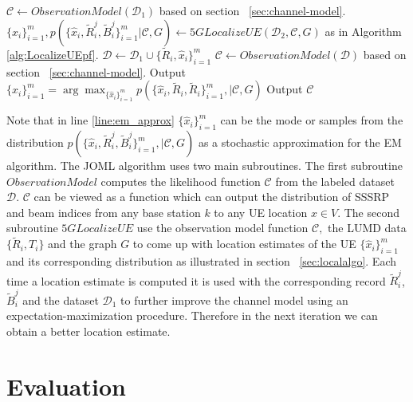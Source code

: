 \documentclass[conference, 10pt]{IEEEtran}
\begin{document}
\begin{algorithm}
\caption{$JOML(\mathcal{D}_1, \mathcal{D}_2, G, N_{em})$}
\label{alg:joint_ch_model_loc}
\begin{algorithmic}[1]
\State $\mathcal{C} \gets Observation Model(\mathcal{D}_1)$ based on section ~\ref{sec:channel-model}.
	\State $\{\hat{x}_i\}_{i=1}^m, p(\{\hat{x}_i,\tilde{R}^j_i,\tilde{B}^j_i\}_{i=1}^m|\mathcal{C},G) \gets 5GLocalizeUE(\mathcal{D}_2,\mathcal{C},G)$ as in Algorithm \ref{alg:LocalizeUEpf}. \label{step:localize}
	\State $\mathcal{D} \gets \mathcal{D}_1 \cup \{\tilde{R}_i,\hat{x}_i\}_{i=1}^m$ \label{line:em_approx}
	\State $\mathcal{C} \gets Observation Model(\mathcal{D})$ based on section ~\ref{sec:channel-model}.
\EndFor
\State Output $\{\hat{x}_i\}_{i=1}^m = \arg \max_{\{\hat{x}_i\}_{i=1}^m} p(\{\hat{x}_i,\tilde{R}_i, \tilde{R}_i\}_{i=1}^m,|\mathcal{C},G)$
\State Output $\mathcal{C}$
\end{algorithmic}
\end{algorithm}  

Note that in line \ref{line:em_approx} $\{\hat{x}_i\}_{i=1}^m$ can be the mode
or samples from the distribution
$p(\{\hat{x}_i,\tilde{R}^j_i, \tilde{B}^j_i\}_{i=1}^m,|\mathcal{C},G)$ as a stochastic
approximation for the EM algorithm. The JOML algorithm uses two main
subroutines. The first subroutine $ObservationModel$ computes the likelihood function
$\mathcal{C}$ from the labeled dataset $\mathcal{D}.$ $\mathcal{C}$ can be
viewed as a function which can output the distribution of SSSRP and beam indices from any base
station $k$ to any UE location $x \in V.$ The second subroutine $5GLocalizeUE$
use the observation model function $\mathcal{C},$ the LUMD data
$\{\tilde{R}_i,T_i\}$ and the graph $G$ to come up with location estimates of
the UE $\{\hat{x}_i\}_{i=1}^m$ and its corresponding distribution as illustrated in section ~\ref{sec:localalgo}. Each time a
location estimate is computed it is used with the corresponding record
$\tilde{R}^j_i$, $\tilde{B}^j_i$ and the dataset $\mathcal{D}_1$ to further improve the channel
model using an expectation-maximization procedure. Therefore in the next
iteration we can obtain a better location estimate. 


\section{Evaluation}
\label{sec:eval}
\end{document}

